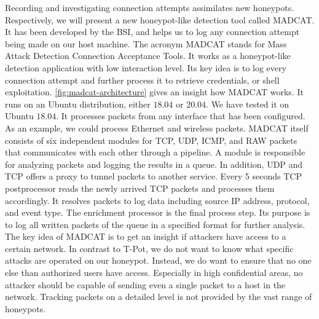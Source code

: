 Recording and investigating connection attempts assimilates new honeypots.
Respectively, we will present a new honeypot-like detection tool called MADCAT.
It has been developed by the BSI, and helps us to log any connection attempt being made on our host machine.
The acronym MADCAT stands for Mass Attack Detection Connection Acceptance Tools.
It works as a honeypot-like detection application with low interaction level.
Its key idea is to log every connection attempt and further process it to retrieve credentials, or shell exploitation.
\autoref{fig:madcat-architecture} gives an insight how MADCAT works.
It runs on an Ubuntu distribution, either $18.04$ or $20.04$.
We have tested it on Ubuntu $18.04$.
It processes packets from any interface that has been configured.
As an example, we could process Ethernet and wireless packets.
MADCAT itself consists of six independent modules for TCP, UDP, ICMP, and RAW packets that communicates with each other through a pipeline.
A module is responsible for analyzing packets and logging the results in a queue.
In addition, UDP and TCP offers a proxy to tunnel packets to another service.
Every 5 seconds TCP postprocessor reads the newly arrived TCP packets and processes them accordingly.
It resolves packets to log data including source IP address, protocol, and event type.
The enrichment processor is the final process step.
Its purpose is to log all written packets of the queue in a specified format for further analysis.
The key idea of MADCAT is to get an insight if attackers have access to a certain network.
In contrast to T-Pot, we do not want to know what specific attacks are operated on our honeypot.
Instead, we do want to ensure that no one else than authorized users have access.
Especially in high confidential areas, no attacker should be capable of sending even a single packet to a host in the network.
Tracking packets on a detailed level is not provided by the vast range of honeypots.

